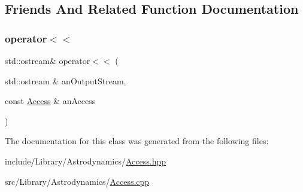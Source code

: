 \subsection{Friends And Related Function Documentation}
\mbox{\label{classlibrary_1_1astro_1_1_access_a84eabd1ef8d3eeff0b6a80851727a2b4}} 
\subsubsection{\texorpdfstring{operator$<$$<$}{operator<<}}
{\footnotesize\ttfamily std\+::ostream\& operator$<$$<$ (\begin{DoxyParamCaption}\item[{std\+::ostream \&}]{an\+Output\+Stream,  }\item[{const \hyperlink{classlibrary_1_1astro_1_1_access}{Access} \&}]{an\+Access }\end{DoxyParamCaption})\hspace{0.3cm}{\ttfamily [friend]}}



The documentation for this class was generated from the following files\+:\begin{DoxyCompactItemize}
\item 
include/\+Library/\+Astrodynamics/\hyperlink{_access_8hpp}{Access.\+hpp}\item 
src/\+Library/\+Astrodynamics/\hyperlink{_access_8cpp}{Access.\+cpp}\end{DoxyCompactItemize}
